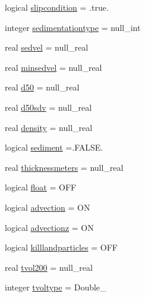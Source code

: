 \begin{DoxyCompactItemize}
\item 
logical \mbox{\hyperlink{structmodulelagrangianglobal_1_1t__movement_acd8e4e1bd0771546293b0843dbec91e8}{slipcondition}} = .true.
\item 
integer \mbox{\hyperlink{structmodulelagrangianglobal_1_1t__movement_a1ce2ce3c3d4f4bd93d804d4fb9541679}{sedimentationtype}} = null\+\_\+int
\item 
real \mbox{\hyperlink{structmodulelagrangianglobal_1_1t__movement_aa8a2112428380b38442715a8079a34f0}{sedvel}} = null\+\_\+real
\item 
real \mbox{\hyperlink{structmodulelagrangianglobal_1_1t__movement_a505eb82c72540bbefc2c20c5bd288a86}{minsedvel}} = null\+\_\+real
\item 
real \mbox{\hyperlink{structmodulelagrangianglobal_1_1t__movement_a1387b9e9cb0fe780de22213a32799e1a}{d50}} = null\+\_\+real
\item 
real \mbox{\hyperlink{structmodulelagrangianglobal_1_1t__movement_ae1ca28a2ce849a85618c45b1ada3ab18}{d50sdv}} = null\+\_\+real
\item 
real \mbox{\hyperlink{structmodulelagrangianglobal_1_1t__movement_a5c106135ac293091154704efc12a07b3}{density}} = null\+\_\+real
\item 
logical \mbox{\hyperlink{structmodulelagrangianglobal_1_1t__movement_aa7b7b0125db053e6f12c0e00e362e2b9}{sediment}} =.F\+A\+L\+S\+E.
\item 
real \mbox{\hyperlink{structmodulelagrangianglobal_1_1t__movement_ab65e5bb7cc049581ade2d5b54969bc6b}{thicknessmeters}} = null\+\_\+real
\item 
logical \mbox{\hyperlink{structmodulelagrangianglobal_1_1t__movement_a32604847a7ca5d56a6508dfe63ff9a51}{float}} = O\+FF
\item 
logical \mbox{\hyperlink{structmodulelagrangianglobal_1_1t__movement_aef3b9083c0845f19936cb7650b64e251}{advection}} = ON
\item 
logical \mbox{\hyperlink{structmodulelagrangianglobal_1_1t__movement_a3f674283030e2cf526e374e96205ae60}{advectionz}} = ON
\item 
logical \mbox{\hyperlink{structmodulelagrangianglobal_1_1t__movement_a1b47879318160995b23c1b0106aa14bb}{killlandparticles}} = O\+FF
\item 
real \mbox{\hyperlink{structmodulelagrangianglobal_1_1t__movement_ab02689f807aca40b6371c836b4500e59}{tvol200}} = null\+\_\+real
\item 
integer \mbox{\hyperlink{structmodulelagrangianglobal_1_1t__movement_ab1cb93445fb7346c6a75dca40ae61f6d}{tvoltype}} = Double\+\_\+

\end{DoxyCompactItemize}
